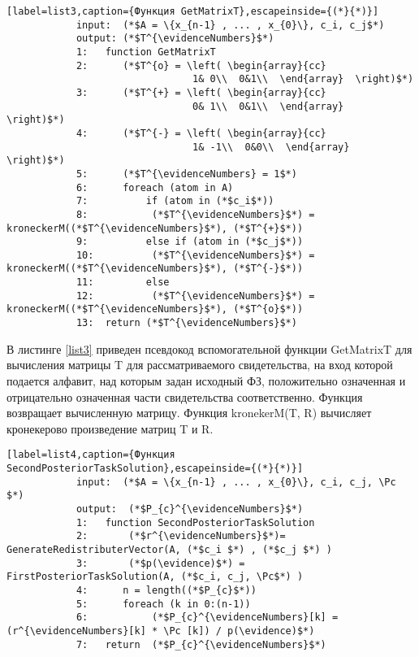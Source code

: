         \begin{lstlisting}[label=list3,caption={Функция GetMatrixT},escapeinside={(*}{*)}]
            input:  (*$A = \{x_{n-1} , ... , x_{0}\}, c_i, c_j$*)	
            output: (*$T^{\evidenceNumbers}$*) 
            1:   function GetMatrixT
            2:   	(*$T^{o} = \left( \begin{array}{cc}
                                1& 0\\  0&1\\  \end{array}  \right)$*)
            3:   	(*$T^{+} = \left( \begin{array}{cc}
                                0& 1\\  0&1\\  \end{array}   \right)$*)
            4:   	(*$T^{-} = \left( \begin{array}{cc}
                                1& -1\\  0&0\\  \end{array}   \right)$*)
            5:	    (*$T^{\evidenceNumbers} = 1$*) 
            6:   	foreach (atom in A)
            7:	      	if (atom in (*$c_i$*))
            8:			 (*$T^{\evidenceNumbers}$*) = kroneckerM((*$T^{\evidenceNumbers}$*), (*$T^{+}$*))
            9:	      	else if (atom in (*$c_j$*))
            10:			 (*$T^{\evidenceNumbers}$*) = kroneckerM((*$T^{\evidenceNumbers}$*), (*$T^{-}$*))
            11:	      	else 
            12:			 (*$T^{\evidenceNumbers}$*) = kroneckerM((*$T^{\evidenceNumbers}$*), (*$T^{o}$*))
            13:	 return (*$T^{\evidenceNumbers}$*)
        \end{lstlisting}
        
        В листинге \ref{list3} приведен псевдокод вспомогательной функции Get\-MatrixT для вычисления матрицы T для рассматриваемого сви\-де\-тель\-ства, на вход которой подается алфавит, над которым задан исходный ФЗ, положительно означенная и отрицательно означенная части свидетельства соответственно. Функция возвращает вычисленную матрицу. Функция kronekerM(T, R) вычисляет кронекерово произведение матриц T и R.
        
        \begin{lstlisting}[label=list4,caption={Функция SecondPosteriorTaskSolution},escapeinside={(*}{*)}]
            input:  (*$A = \{x_{n-1} , ... , x_{0}\}, c_i, c_j, \Pc $*)		
            output:  (*$P_{c}^{\evidenceNumbers}$*)
            1:   function SecondPosteriorTaskSolution
            2:   	 (*$r^{\evidenceNumbers}$*)= GenerateRedistributerVector(A, (*$c_i $*) , (*$c_j $*) )
            3:		 (*$p(\evidence)$*) = FirstPosteriorTaskSolution(A, (*$c_i, c_j, \Pc$*) )
            4:		n = length((*$P_{c}$*))
            5:   	foreach (k in 0:(n-1))
            6:	      	 (*$P_{c}^{\evidenceNumbers}[k] = (r^{\evidenceNumbers}[k] * \Pc [k]) / p(\evidence)$*)
            7:	 return  (*$P_{c}^{\evidenceNumbers}$*)
        \end{lstlisting}
        
